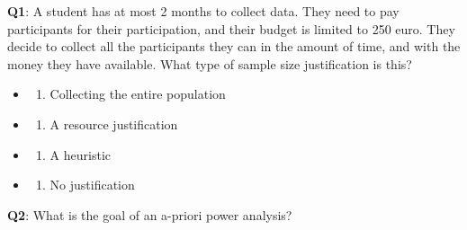 \documentclass[
  letterpaper,
  DIV=11,
  numbers=noendperiod]{scrreprt}
\providecommand{\tightlist}{%
  \setlength{\itemsep}{0pt}\setlength{\parskip}{0pt}}\usepackage{longtable,booktabs,array}
\begin{document}
\textbf{Q1}: A student has at most 2 months to collect data. They need
to pay participants for their participation, and their budget is limited
to 250 euro. They decide to collect all the participants they can in the
amount of time, and with the money they have available. What type of
sample size justification is this?

\begin{itemize}
\item
  \begin{enumerate}
  \def\labelenumi{(\Alph{enumi})}
  \tightlist
  \item
    Collecting the entire population\\
  \end{enumerate}
\item
  \begin{enumerate}
  \def\labelenumi{(\Alph{enumi})}
  \setcounter{enumi}{1}
  \tightlist
  \item
    A resource justification\\
  \end{enumerate}
\item
  \begin{enumerate}
  \def\labelenumi{(\Alph{enumi})}
  \setcounter{enumi}{2}
  \tightlist
  \item
    A heuristic\\
  \end{enumerate}
\item
  \begin{enumerate}
  \def\labelenumi{(\Alph{enumi})}
  \setcounter{enumi}{3}
  \tightlist
  \item
    No justification\\
  \end{enumerate}
\end{itemize}

\textbf{Q2}: What is the goal of an a-priori power analysis?
\end{document}
